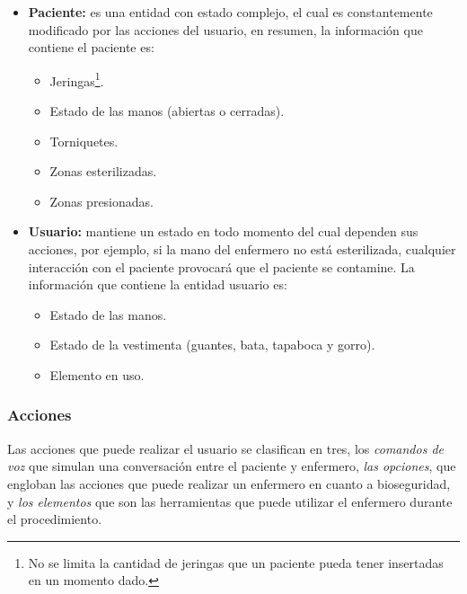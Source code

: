 \begin{itemize}

\item \textbf{Paciente:} es una entidad con estado complejo, el cual es
    constantemente modificado por las acciones del usuario, en resumen, la
    información que contiene el paciente es:
    \begin{itemize}
        \item Jeringas\footnote{No se limita la cantidad de jeringas que un
                paciente pueda tener insertadas en un momento dado.}.
        \item Estado de las manos (abiertas o cerradas).
        \item Torniquetes.
        \item Zonas esterilizadas.
        \item Zonas presionadas.
    \end{itemize}

\item \textbf{Usuario:} mantiene un estado en todo momento del cual dependen sus
    acciones, por ejemplo, si la mano del enfermero no está esterilizada,
    cualquier interacción con el paciente provocará que el paciente se
    contamine. La información que contiene la entidad usuario es:

    \begin{itemize}
    \item Estado de las manos.
    \item Estado de la vestimenta (guantes, bata, tapaboca y gorro).
    \item Elemento en uso.
    \end{itemize}
\end{itemize}

\subsubsection{Acciones}

Las acciones que puede realizar el usuario se clasifican en tres, los
\emph{comandos de voz} que simulan una conversación entre el paciente y
enfermero, \emph{las opciones}, que engloban las acciones que puede realizar un
enfermero en cuanto a bioseguridad, y \emph{los elementos} que son las
herramientas que puede utilizar el enfermero durante el procedimiento.

